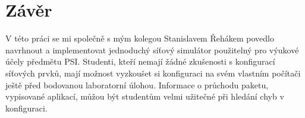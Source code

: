 % 


\chapter{Závěr}

V této práci se mi společně s mým kolegou Stanislavem Řehákem povedlo navrhnout a implementovat jednoduchý síťový simulátor použitelný pro výukové účely předmětu PSI. Studenti, kteří nemají žádné zkušenosti s konfigurací síťových prvků, mají možnost vyzkoušet si konfiguraci na svém vlastním počítači ještě před bodovanou laboratorní úlohou. Informace o průchodu paketu, vypisované aplikací, můžou být studentům velmi užitečné při hledání chyb v konfiguraci.  